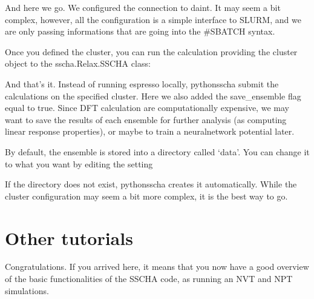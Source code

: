 \documentclass[a4paper,11pt,english]{sphinxmanual}
\begin{document}
\sphinxAtStartPar
And here we go. We configured the connection to daint. It may seem a bit complex, however, all the configuration is a simple interface to SLURM, and we are only passing informations that are going into the \#SBATCH syntax.

\sphinxAtStartPar
Once you defined the cluster, you can run the calculation providing the cluster object to the sscha.Relax.SSCHA class:

\begin{sphinxVerbatim}[commandchars=\\\{\}]
   
               
               
               
               
\end{sphinxVerbatim}

\sphinxAtStartPar
And that’s it. Instead of running espresso locally, python\sphinxhyphen{}sscha submit the calculations on the specified cluster.
Here we also added the save\_ensemble flag equal to true. Since DFT calculation are computationally expensive, we may want to save the results of each ensemble for further analysis (as computing linear response properties), or maybe to train a neural\sphinxhyphen{}network potential later.

\sphinxAtStartPar
By default, the ensemble is stored into a directory called ‘data’. You can change it to what you want by editing the setting

\begin{sphinxVerbatim}[commandchars=\\\{\}]
  
\end{sphinxVerbatim}

\sphinxAtStartPar
If the directory does not exist, python\sphinxhyphen{}sscha creates it automatically.
While the cluster configuration may seem a bit more complex, it is the best way to go.


\section{Other tutorials}
\label{\detokenize{start:other-tutorials}}
\sphinxAtStartPar
Congratulations. If you arrived here, it means that you now have a good overview of the basic functionalities of the SSCHA code, as running an NVT and NPT simulations.
\end{document}

